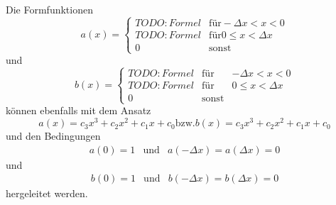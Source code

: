 Die Formfunktionen
\begin{equation}
    a(x) = \left\{ \begin{array}{rcl}
        TODO: Formel & \mbox{für} -\Delta x < x < 0 \\
        TODO: Formel & \mbox{für} 0 \leq x < \Delta x \\
        0            & \mbox{sonst}
    \end{array} \right.
\end{equation}
und
\begin{equation}
    b(x) = \left\{ \begin{array}{rcl}
        TODO: Formel & \mbox{für} & -\Delta x < x < 0 \\
        TODO: Formel & \mbox{für} & 0 \leq x < \Delta x \\
        0            & \mbox{sonst}
    \end{array} \right.
\end{equation}
können ebenfalls mit dem Ansatz
\begin{equation}
    a(x) = c_3x^3 + c_2x^2 + c_1x + c_0 \mbox{bzw.} b(x) = c_3x^3 + c_2x^2 + c_1x + c_0
\end{equation}
und den Bedingungen 
\begin{equation}
    \begin{array}{ccc}
        a(0) = 1 & \mbox{und} & a(-\Delta x) = a(\Delta x) = 0
    \end{array}
\end{equation}
und
\begin{equation}
    \begin{array}{ccc}
        b(0) = 1 & \mbox{und} & b(-\Delta x) = b(\Delta x) = 0
    \end{array}
\end{equation}
hergeleitet werden.


